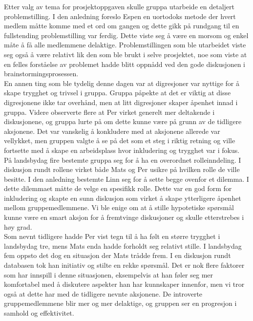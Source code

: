 Etter valg av tema for prosjektoppgaven skulle gruppa utarbeide en detaljert problemstilling. I den anledning foreslo Espen en uortodoks metode der hvert medlem måtte komme med et ord om gangen og dette gikk på rundgang til en fullstending problemstilling var ferdig. Dette viste seg å være en morsom og enkel måte å få alle medlemmene delaktige. Problemstillingen som ble utarbeidet viste seg også å være relativt lik den som ble brukt i selve prosjektet, noe som viste at en felles forståelse av problemet hadde blitt oppnådd ved den gode diskusjonen i brainstormingsprosessen.\\

En annen ting som ble tydelig denne dagen var at digresjoner var nyttige for å skape trygghet og trivsel i gruppa. Gruppa påpekte at det er viktig at disse digresjonene ikke tar overhånd, men at litt digresjoner skaper åpenhet innad i gruppa. Videre observerte flere at Per virket generelt mer deltakende i diskusjonene, og gruppa lurte på om dette kunne være på grunn av de tidligere aksjonene. Det var vanskelig å konkludere med at aksjonene allerede var vellykket, men gruppen valgte å se på det som et steg i riktig retning og ville fortsette med å skape en arbeidsplass hvor inkludering og trygghet var i fokus.\\

På landsbydag fire bestemte gruppa seg for å ha en overordnet rolleinndeling. I diskusjon rundt rollene virket både Mats og Per usikre på hvilken rolle de ville besitte. I den anledning bestemte Linn seg for å sette begge ovenfor et dilemma. I dette dilemmaet måtte de velge en spesifikk rolle. Dette var en god form for inkludering og skapte en sunn diskusjon som virket å skape ytterligere åpenhet mellom gruppemedlemmene. Vi ble enige om at å stille hypotetiske spørsmål kunne være en smart aksjon for å fremtvinge diskusjoner og skulle etterstrebes i høy grad.\\

Som nevnt tidligere hadde Per vist tegn til å ha følt en større trygghet i landsbydag tre, mens Mats enda hadde forholdt seg relativt stille. I landsbydag fem oppsto det dog en situasjon der Mats trådde frem. I en diskusjon rundt databasen tok han initiativ og stilte en rekke spørsmål. Det er nok flere faktorer som har innspill i denne situasjonen, eksempelvis at han føler seg mer komfortabel med å diskutere aspekter han har kunnskaper innenfor, men vi tror også at dette har med de tidligere nevnte aksjonene. De introverte gruppemedlemmene blir mer og mer delaktige, og gruppen ser en progresjon i samhold og effektivitet.\\


